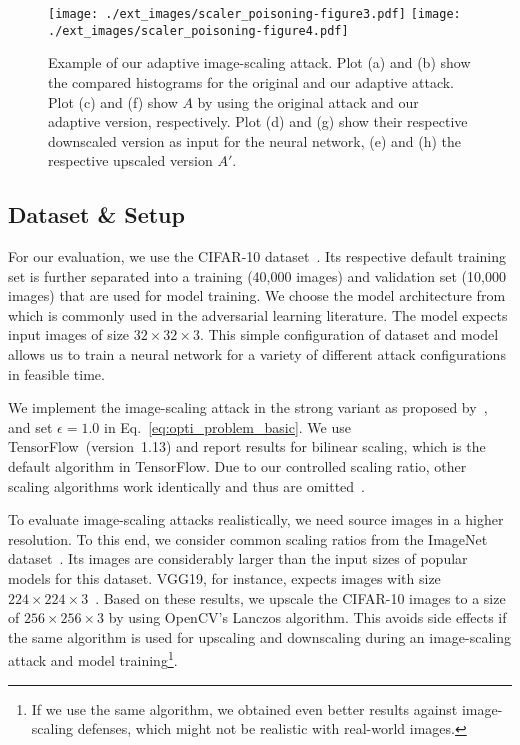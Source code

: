 \documentclass[conference]{IEEEtran}
\newcommand{\attimg}{\ensuremath{A}\xspace}
\begin{document}
\begin{figure}
	\centering
	\texttt{[image: ./ext\_images/scaler\_poisoning-figure3.pdf]}
	\texttt{[image: ./ext\_images/scaler\_poisoning-figure4.pdf]}
	\vspace{-0.30cm} \caption{Example of our adaptive image-scaling attack. 
		Plot (a) and (b) show the compared histograms for the original 
		and 
		our adaptive attack.
		Plot (c) and (f) show \attimg by using the 
		original attack and our adaptive version, respectively. Plot 
		(d) 
		and (g) show their respective downscaled version as input for 
		the 
		neural network, (e) and (h) the respective upscaled version 
		$\attimg'$.}
	\label{fig:adaptive_attack_example}
\end{figure}

\subsection{Dataset \& Setup}
For our evaluation, we use the CIFAR-10 dataset~\citep{KriHin09}. Its 
respective default training set is further separated into a training 
(40,000 images) and validation set (10,000 images) that are used for 
model training. We choose the model architecture from \citet{CarWag17} 
which is commonly used in the adversarial learning literature. The 
model expects input images of size $32 \times 32 \times 3$. This 
simple configuration of dataset and model allows us to train a neural 
network for a variety of different attack configurations in feasible 
time. 

We {implement\EndAccSupp{}} the image-scaling attack in the {strong\EndAccSupp{}} variant as proposed 
by~\citet{XiaCheShe+19}, and set $\epsilon=1.0$ in 
Eq.~\eqref{eq:opti_problem_basic}. 
We use TensorFlow~(version~1.13) and report results for bilinear 
scaling, which is the default algorithm in TensorFlow. Due to our 
controlled scaling {ratio\EndAccSupp{}}, other scaling algorithms work identically and 
thus are omitted~\citep[see][]{QuiKleArp20}.

To evaluate image-scaling attacks realistically, we need source images 
in a higher resolution. To this end, we consider common scaling ratios 
from the ImageNet dataset~\citep{RusDenSu+15}. Its images are 
considerably larger than the input sizes of popular models for this 
dataset. VGG19, for instance, expects images with size $224 \times 224 
\times 3$~\citep{SimZis14}. Based on these results, 
we upscale the CIFAR-10 images to a size of $256 \times 256 \times 
3$ by using OpenCV's Lanczos algorithm. This avoids side effects if 
the same algorithm is used for upscaling and downscaling during an 
image-scaling attack and model training\footnote{If we use the same 
algorithm, we obtained even better results against image-scaling 
defenses, which might not be realistic with real-world images.}.
\end{document}
